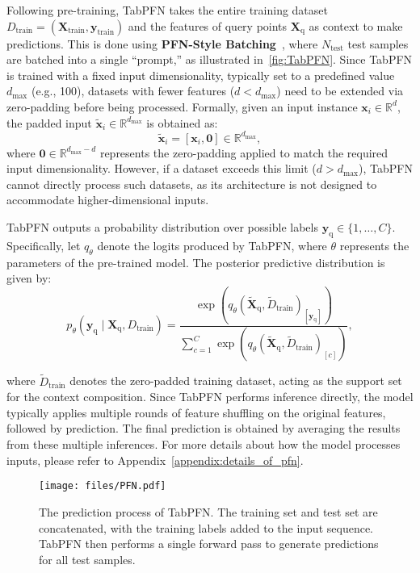 Following pre-training, TabPFN takes the entire training dataset \(D_{\text{train}}=(\boldsymbol{X}_{\text{train}} ,\boldsymbol{y}_{\text{train}})\) and the features of query points \(\boldsymbol{X}_{\text{q}}\) as context to make predictions. This is done using \textbf{PFN-Style Batching}~\cite{Hollmann2022TabPFN}, where \(N_{\text{test}}\) test samples are batched into a single ``prompt,'' as illustrated in~\autoref{fig:TabPFN}. 
Since TabPFN is trained with a fixed input dimensionality, typically set to a predefined value \(d_{\max}\) (e.g., 100), datasets with fewer features (\(d < d_{\max}\)) need to be extended via zero-padding before being processed. Formally, given an input instance \(\boldsymbol{x}_i \in \mathbb{R}^d\), the padded input \(\tilde{\boldsymbol{x}}_i \in \mathbb{R}^{d_{\max}}\) is obtained as:
\begin{equation}
\tilde{\boldsymbol{x}}_i = \left[ \boldsymbol{x}_i, \boldsymbol{0} \right] \in \mathbb{R}^{d_{\max}},
\end{equation}
where \(\boldsymbol{0} \in \mathbb{R}^{d_{\max} - d}\) represents the zero-padding applied to match the required input dimensionality. However, if a dataset exceeds this limit (\(d > d_{\max}\)), TabPFN cannot directly process such datasets, as its architecture is not designed to accommodate higher-dimensional inputs.

TabPFN outputs a probability distribution over possible labels \(\boldsymbol{y}_{\text{q}} \in \{1, \dots, C\}\). Specifically, let \( q_\theta \) denote the logits produced by TabPFN, where \( \theta \) represents the parameters of the pre-trained model. The posterior predictive distribution is given by:
\vspace{-3mm}
\begin{equation} 
\label{eq:tabpfn_post_pred}
p_\theta(\boldsymbol{y}_{\text{q}} \mid \boldsymbol{X}_{\text{q}}, D_{\text{train}}) =  \frac{\exp(q_\theta(\tilde{\boldsymbol{X}}_{\text{q}}, \tilde{D}_{\text{train}})_{[\boldsymbol{y}_{\text{q}}]})}{\sum_{c=1}^C \exp(q_\theta(\tilde{\boldsymbol{X}}_{\text{q}}, \tilde{D}_{\text{train}})_{[c]})},  
\end{equation}

\vspace{-2mm}
where \(\tilde{D}_{\text{train}}\) denotes the zero-padded training dataset, acting as the support set for the context composition. Since TabPFN performs inference directly, the model typically applies multiple rounds of feature shuffling on the original features, followed by prediction. The final prediction is obtained by averaging the results from these multiple inferences. For more details about how the model processes inputs, please refer to Appendix~\ref{appendix:details_of_pfn}.
\begin{figure}[t]
    \centering
    \texttt{[image: files/PFN.pdf]}
    \vspace{-5mm}
    \caption{The prediction process of TabPFN. The training set and test set are concatenated, with the training labels added to the input sequence. TabPFN then performs a single forward pass to generate predictions for all test samples.}
    \label{fig:TabPFN}
    \vspace{-5mm}
\end{figure}

